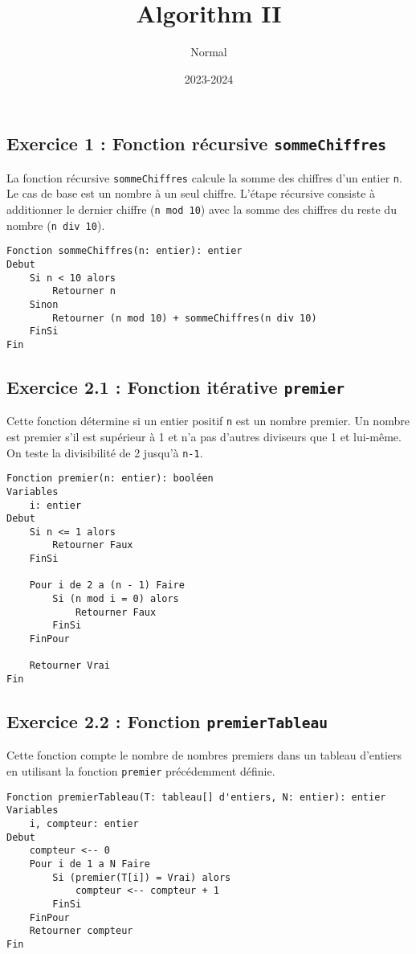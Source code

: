 \documentclass[12pt]{article}
\title{Algorithm II}
\author{Normal}
\date{2023-2024}
\begin{document}
\maketitle

\subsection*{Exercice 1 : Fonction récursive \texttt{sommeChiffres}}
La fonction récursive \texttt{sommeChiffres} calcule la somme des chiffres d'un entier \texttt{n}. Le cas de base est un nombre à un seul chiffre. L'étape récursive consiste à additionner le dernier chiffre (\texttt{n mod 10}) avec la somme des chiffres du reste du nombre (\texttt{n div 10}).

\begin{verbatim}
Fonction sommeChiffres(n: entier): entier
Debut
    Si n < 10 alors
        Retourner n
    Sinon
        Retourner (n mod 10) + sommeChiffres(n div 10)
    FinSi
Fin
\end{verbatim}





\subsection*{Exercice 2.1 : Fonction itérative \texttt{premier}}
Cette fonction détermine si un entier positif \texttt{n} est un nombre premier. Un nombre est premier s'il est supérieur à 1 et n'a pas d'autres diviseurs que 1 et lui-même. On teste la divisibilité de 2 jusqu'à \texttt{n-1}.

\begin{verbatim}
Fonction premier(n: entier): booléen
Variables
    i: entier
Debut
    Si n <= 1 alors
        Retourner Faux
    FinSi
    
    Pour i de 2 a (n - 1) Faire
        Si (n mod i = 0) alors
            Retourner Faux
        FinSi
    FinPour
    
    Retourner Vrai
Fin
\end{verbatim}

\subsection*{Exercice 2.2 : Fonction \texttt{premierTableau}}
Cette fonction compte le nombre de nombres premiers dans un tableau d'entiers en utilisant la fonction \texttt{premier} précédemment définie.

\begin{verbatim}
Fonction premierTableau(T: tableau[] d'entiers, N: entier): entier
Variables
    i, compteur: entier
Debut
    compteur <-- 0
    Pour i de 1 a N Faire
        Si (premier(T[i]) = Vrai) alors
            compteur <-- compteur + 1
        FinSi
    FinPour
    Retourner compteur
Fin
\end{verbatim}
\end{document}
